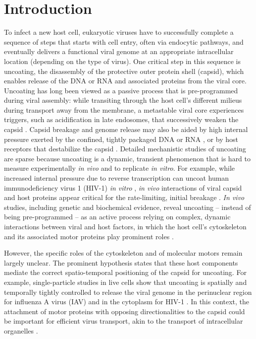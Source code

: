 \section{Introduction}

To infect a new host cell, eukaryotic viruses have to successfully complete a sequence of steps that starts with cell entry, often via endocytic pathways, and eventually delivers a functional viral genome at an appropriate intracellular location (depending on the type of virus). One critical step in this sequence is uncoating, the disassembly of the protective outer protein shell (capsid), which enables release of the DNA or RNA and associated proteins from the viral core. Uncoating has long been viewed as a passive process that is pre-programmed during viral assembly: while transiting through the host cell’s different milieus during transport away from the membrane, a metastable viral core experiences triggers, such as acidification in late endosomes, that successively weaken the capsid \cite{marsh2006virus}. Capsid breakage and genome release may also be aided by high internal pressure exerted by the confined, tightly packaged DNA or RNA \cite{brandariz2019pressure}, or by host receptors that destabilize the capsid \cite{zhao2019human}. Detailed mechanistic studies of uncoating are sparse because uncoating is a dynamic, transient phenomenon that is hard to measure experimentally \textit{in vivo} and to replicate \textit{in vitro}. For example, while increased internal pressure due to reverse transcription can uncoat human immunodeficiency virus 1 (HIV-1) \textit{in vitro} \cite{rankovic2017reverse}, \textit{in vivo} interactions of viral capsid and host proteins appear critical for the rate-limiting, initial breakage \cite{marquez2018kinetics, rawle2018toward}. \textit{In vivo} studies, including genetic and biochemical evidence, reveal uncoating – instead of being pre-programmed – as an active process relying on complex, dynamic interactions between viral and host factors, in which the host cell’s cytoskeleton and its associated motor proteins play prominent roles \cite{greber2019adenovirus, helenius2018virus, james2018human, walsh2019exploitation}.

However, the specific roles of the cytoskeleton and of molecular motors remain largely unclear. The prominent hypothesis states that these host components mediate the correct spatio-temporal positioning of the capsid for uncoating. For example, single-particle studies in live cells show that uncoating is spatially and temporally tightly controlled to release the viral genome in the perinuclear region for influenza A virus (IAV) \cite{qin2019real} and in the cytoplasm for HIV-1 \cite{francis2016time}. In this context, the attachment of motor proteins with opposing directionalities to the capsid could be important for efficient virus transport, akin to the transport of intracellular organelles \cite{kural2005kinesin}.

